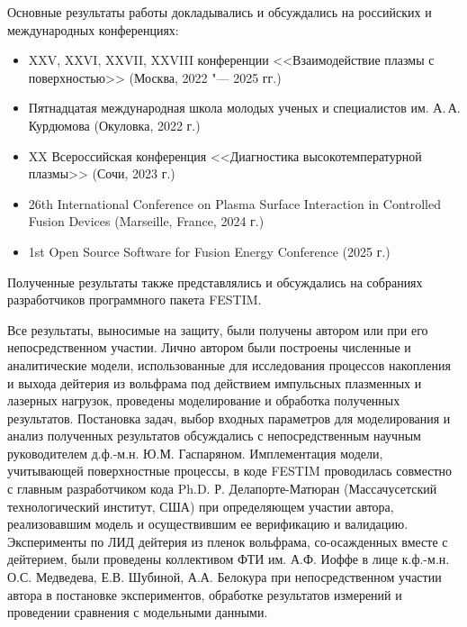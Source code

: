 {\probation}
Основные результаты работы докладывались и обсуждались на российских и международных конференциях:
\begin{itemize}
    \item XXV, XXVI, XXVII, XXVIII конференции <<Взаимодействие плазмы с поверхностью>> (Москва, 2022 "--- 2025 гг.)
    \item Пятнадцатая международная школа молодых ученых и специалистов им. А.\,А. Курдюмова (Окуловка, 2022 г.)
    \item XX Всероссийская конференция <<Диагностика высокотемпературной плазмы>> (Сочи, 2023 г.)
    \item 26th International Conference on Plasma Surface Interaction in Controlled Fusion Devices (Marseille, France, 2024 г.)
    \item 1st Open Source Software for Fusion Energy Conference (2025 г.)
\end{itemize}
Полученные результаты также представлялись и обсуждались на собраниях разработчиков программного пакета FESTIM. 

{\contribution} Все результаты, выносимые на защиту, были получены автором или при его непосредственном участии. Лично автором были построены численные и аналитические модели, использованные для исследования процессов накопления и выхода дейтерия из вольфрама под действием импульсных плазменных и лазерных нагрузок, проведены моделирование и обработка полученных результатов. Постановка задач, выбор входных параметров для моделирования и анализ полученных результатов обсуждались с непосредственным научным руководителем д.ф.-м.н. Ю.М. Гаспаряном. Имплементация модели, учитывающей поверхностные процессы, в коде FESTIM проводилась совместно с главным разработчиком кода Ph.D. Р. Делапорте-Матюран (Массачусетский технологический институт, США) при определяющем участии автора, реализовавшим модель и осуществившим ее верификацию и валидацию. Эксперименты по ЛИД дейтерия из пленок вольфрама, со-осажденных вместе с дейтерием, были проведены коллективом ФТИ им. А.Ф. Иоффе в лице к.ф.-м.н. О.С. Медведева, Е.В. Шубиной, А.А. Белокура при непосредственном участии автора в постановке экспериментов, обработке результатов измерений и проведении сравнения с модельными данными.

